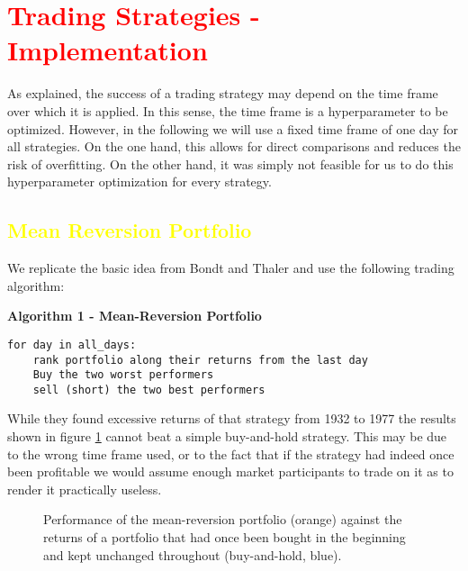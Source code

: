 \section{\textcolor{red}{Trading Strategies - Implementation}}
As explained, the success of a trading strategy may depend on the time frame over which it is applied. In this sense, the time frame is a hyperparameter to be optimized. However, in the following we will use a fixed time frame of one day for all strategies. On the one hand, this allows for direct comparisons and reduces the risk of overfitting. On the other hand, it was simply not feasible for us to do this hyperparameter optimization for every strategy. 

\subsection{\textcolor{yellow}{Mean Reversion Portfolio}}
We replicate the basic idea from Bondt and Thaler \citet{bondt_does_1985} and use the following trading algorithm: 

\vspace{2ex}
\textbf{\small{Algorithm 1 - Mean-Reversion Portfolio}}
\vspace{-1ex}
\begin{verbatim}
for day in all_days: 
    rank portfolio along their returns from the last day
    Buy the two worst performers
    sell (short) the two best performers
\end{verbatim}

While they found excessive returns of that strategy from 1932 to 1977 the results shown in figure \ref{fig:mean reversion} cannot beat a simple buy-and-hold strategy. This may be due to the wrong time frame used, or to the fact that if the strategy had indeed once been profitable we would assume enough market participants to trade on it as to render it practically useless. 


\begin{figure}[h!]
    \centering
    \begin{adjustbox}{width=.95\textwidth,center}
        
    \end{adjustbox}  
    \caption{Performance of the mean-reversion portfolio (orange) against the returns of a portfolio that had once been bought in the beginning and kept unchanged throughout (buy-and-hold, blue).}
    \label{fig:mean reversion}
\end{figure}{}


